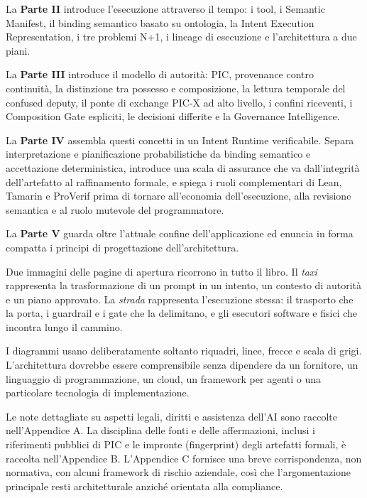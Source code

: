 \documentclass[10pt,oneside,openany]{book}
\makeatletter
\renewcommand\mainmatter{\clearpage\@mainmattertrue}
\makeatother
\begin{document}
La \textbf{Parte II} introduce l'esecuzione attraverso il tempo: i tool, i Semantic Manifest, il binding semantico basato su ontologia, la Intent Execution Representation, i tre problemi N+1, i lineage di esecuzione e l'architettura a due piani.

La \textbf{Parte III} introduce il modello di autorità: PIC, provenance contro continuità, la distinzione tra possesso e composizione, la lettura temporale del confused deputy, il ponte di exchange PIC-X ad alto livello, i confini riceventi, i Composition Gate espliciti, le decisioni differite e la Governance Intelligence.

La \textbf{Parte IV} assembla questi concetti in un Intent Runtime verificabile. Separa interpretazione e pianificazione probabilistiche da binding semantico e accettazione deterministica, introduce una scala di assurance che va dall'integrità dell'artefatto al raffinamento formale, e spiega i ruoli complementari di Lean, Tamarin e ProVerif prima di tornare all'economia dell'esecuzione, alla revisione semantica e al ruolo mutevole del programmatore.

La \textbf{Parte V} guarda oltre l'attuale confine dell'applicazione ed enuncia in forma compatta i principi di progettazione dell'architettura.

Due immagini delle pagine di apertura ricorrono in tutto il libro. Il \emph{taxi} rappresenta la trasformazione di un prompt in un intento, un contesto di autorità e un piano approvato. La \emph{strada} rappresenta l'esecuzione stessa: il trasporto che la porta, i guardrail e i gate che la delimitano, e gli esecutori software e fisici che incontra lungo il cammino.

I diagrammi usano deliberatamente soltanto riquadri, linee, frecce e scala di grigi. L'architettura dovrebbe essere comprensibile senza dipendere da un fornitore, un linguaggio di programmazione, un cloud, un framework per agenti o una particolare tecnologia di implementazione.

Le note dettagliate su aspetti legali, diritti e assistenza dell'AI sono raccolte nell'Appendice A. La disciplina delle fonti e delle affermazioni, inclusi i riferimenti pubblici di PIC e le impronte (fingerprint) degli artefatti formali, è raccolta nell'Appendice B. L'Appendice C fornisce una breve corrispondenza, non normativa, con alcuni framework di rischio aziendale, così che l'argomentazione principale resti architetturale anziché orientata alla compliance.

\mainmatter
\end{document}
